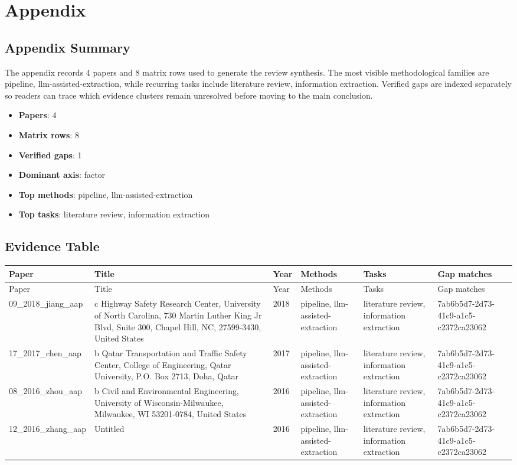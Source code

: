 \documentclass{article}
\begin{document}
\appendix
\section{Appendix}
\subsection{Appendix Summary}
\noindent The appendix records 4 papers and 8 matrix rows used to generate the review synthesis. The most visible methodological families are pipeline, llm-assisted-extraction, while recurring tasks include literature review, information extraction. Verified gaps are indexed separately so readers can trace which evidence clusters remain unresolved before moving to the main conclusion.

\begin{itemize}
\item \textbf{Papers}: 4
\item \textbf{Matrix rows}: 8
\item \textbf{Verified gaps}: 1
\item \textbf{Dominant axis}: factor
\item \textbf{Top methods}: pipeline, llm-assisted-extraction
\item \textbf{Top tasks}: literature review, information extraction
\end{itemize}

\subsection{Evidence Table}
\begin{longtable}{p{}p{}p{}p{}p{}p{}}
\toprule
Paper & Title & Year & Methods & Tasks & Gap matches \\
\midrule
\endfirsthead
\toprule
Paper & Title & Year & Methods & Tasks & Gap matches \\
\midrule
\endhead
09\_2018\_jiang\_aap & c Highway Safety Research Center, University of North Carolina, 730 Martin Luther King Jr Blvd, Suite 300, Chapel Hill, NC, 27599-3430, United States & 2018 & pipeline, llm-assisted-extraction & literature review, information extraction & 7ab6b5d7-2d73-41c9-a1c5-c2372ca23062 \\
17\_2017\_chen\_aap & b Qatar Transportation and Traﬃc Safety Center, College of Engineering, Qatar University, P.O. Box 2713, Doha, Qatar & 2017 & pipeline, llm-assisted-extraction & literature review, information extraction & 7ab6b5d7-2d73-41c9-a1c5-c2372ca23062 \\
08\_2016\_zhou\_aap & b Civil and Environmental Engineering, University of Wisconsin-Milwaukee, Milwaukee, WI 53201-0784, United States & 2016 & pipeline, llm-assisted-extraction & literature review, information extraction & 7ab6b5d7-2d73-41c9-a1c5-c2372ca23062 \\
12\_2016\_zhang\_aap & Untitled & 2016 & pipeline, llm-assisted-extraction & literature review, information extraction & 7ab6b5d7-2d73-41c9-a1c5-c2372ca23062 \\
\bottomrule
\end{longtable}
\end{document}
